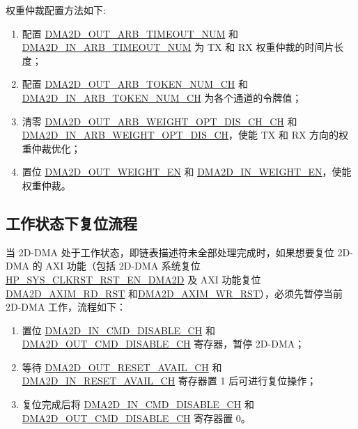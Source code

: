 \documentclass[main\_\_CN.tex]{subfiles}
\begin{document}
权重仲裁配置方法如下:
\begin{enumerate}
\item 配置 \hyperref[fielddesc:DMA2DOUTARBTIMEOUTNUM]{DMA2D\_OUT\_ARB\_TIMEOUT\_NUM} 和 \hyperref[fielddesc:DMA2DINARBTIMEOUTNUM]{DMA2D\_IN\_ARB\_TIMEOUT\_NUM} 为 TX 和 RX 权重仲裁的时间片长度；
\item 配置 \hyperref[fielddesc:DMA2DOUTARBTOKENNUMCHN]{DMA2D\_OUT\_ARB\_TOKEN\_NUM\_CH} 和 \hyperref[fielddesc:DMA2DINARBTOKENNUMCHN]{DMA2D\_IN\_ARB\_TOKEN\_NUM\_CH} 为各个通道的令牌值；
\item 清零 \hyperref[fielddesc:DMA2DOUTARBWEIGHTOPTDISCHN]{DMA2D\_OUT\_ARB\_WEIGHT\_OPT\_DIS\_CH\_CH} 和\hyperref[fielddesc:DMA2DINARBWEIGHTOPTDISCHN]{DMA2D\_IN\_ARB\_WEIGHT\_OPT\_DIS\_CH}，使能 TX 和 RX 方向的权重仲裁优化；
\item 置位 \hyperref[fielddesc:DMA2DOUTWEIGHTEN]{DMA2D\_OUT\_WEIGHT\_EN} 和 \hyperref[fielddesc:DMA2DINWEIGHTEN]{DMA2D\_IN\_WEIGHT\_EN}，使能权重仲裁。
\end{enumerate}


\subsection{工作状态下复位流程}
当 2D-DMA 处于工作状态，即链表描述符未全部处理完成时，如果想要复位 2D-DMA 的 AXI 功能（包括 2D-DMA 系统复位 \hyperref[fielddesc:HPSYSCLKRSTRSTENDMA2D]{HP\_SYS\_CLKRST\_RST\_EN\_DMA2D} 及 AXI 功能复位 \hyperref[fielddesc:DMA2DAXIMRDRST]{DMA2D\_AXIM\_RD\_RST} 和\hyperref[fielddesc:DMA2DAXIMWRRST]{DMA2D\_AXIM\_WR\_RST}），必须先暂停当前 2D-DMA 工作，流程如下：

\begin{enumerate}
    \item 置位 \hyperref[fielddesc:DMA2DINCMDDISABLECHN]{DMA2D\_IN\_CMD\_DISABLE\_CH} 和 \hyperref[fielddesc:DMA2DOUTCMDDISABLECHN]{DMA2D\_OUT\_CMD\_DISABLE\_CH} 寄存器，暂停 2D-DMA；
    \item 等待  \hyperref[fielddesc:DMA2DOUTRESETAVAILCHN]{DMA2D\_OUT\_RESET\_AVAIL\_CH} 和 \hyperref[fielddesc:DMA2DINRESETAVAILCHN]{DMA2D\_IN\_RESET\_AVAIL\_CH} 寄存器置 1 后可进行复位操作；
    \item 复位完成后将 \hyperref[fielddesc:DMA2DINCMDDISABLECHN]{DMA2D\_IN\_CMD\_DISABLE\_CH} 和 \hyperref[fielddesc:DMA2DOUTCMDDISABLECHN]{DMA2D\_OUT\_CMD\_DISABLE\_CH} 寄存器置 0。
\end{enumerate}
\end{document}
